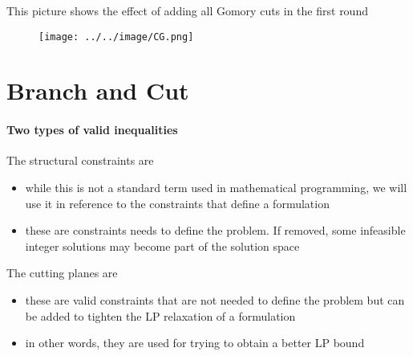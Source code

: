                 This picture shows the effect of adding all Gomory cuts in the first round
                \begin{figure}[!h]
                    \centering
                    \texttt{[image: ../../image/CG.png]}
                \end{figure}

    \section{Branch and Cut}
        \paragraph{Two types of valid inequalities}
            The structural constraints are 
            \begin{itemize}
                \item while this is not a standard term used in mathematical programming, we will use it in reference to the constraints that define a formulation
                \item these are constraints needs to define the problem. If removed, some infeasible integer solutions may become part of the solution space
            \end{itemize}

            The cutting planes are
            \begin{itemize}
                \item these are valid constraints that are not needed to define the problem but can be added to tighten the LP relaxation of a formulation
                \item in other words, they are used for trying to obtain a better LP bound
            \end{itemize}

